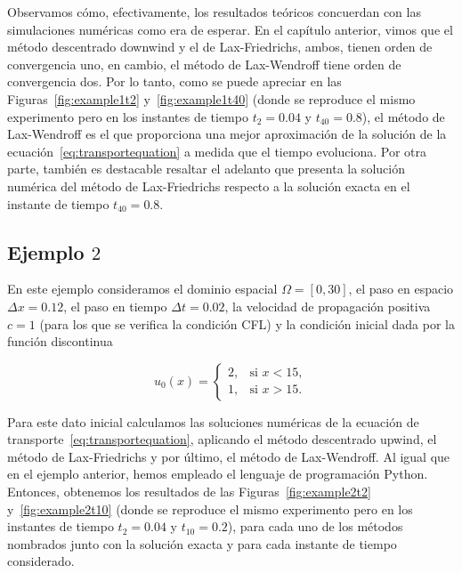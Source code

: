 Observamos cómo, efectivamente, los resultados teóricos concuerdan
con las simulaciones numéricas como era de esperar.
En el capítulo anterior, vimos que el método descentrado downwind y
el de Lax-Friedrichs, ambos, tienen orden de convergencia uno, en
cambio, el método de Lax-Wendroff tiene orden de convergencia dos.
Por lo tanto, como se puede apreciar en las
Figuras~\ref{fig:example1t2} y~\ref{fig:example1t40} (donde se
reproduce el mismo experimento pero en los instantes de tiempo
$t_{2}=0.04$ y $t_{40}=0.8$), el método de Lax-Wendroff es el que
proporciona una mejor aproximación de la solución de la
ecuación~\eqref{eq:transportequation} a medida que el tiempo
evoluciona.
Por otra parte, también es destacable resaltar el adelanto que
presenta la solución numérica del método de Lax-Friedrichs respecto a
la solución exacta en el instante de tiempo $t_{40}=0.8$.

\subsection*{Ejemplo $2$}

En este ejemplo consideramos el dominio espacial
$\Omega=\left[0,30\right]$, el paso en espacio $\Delta x=0.12$, el
paso en tiempo $\Delta t=0.02$, la velocidad de propagación positiva
$c=1$ (para los que se verifica la condición CFL) y la condición
inicial dada por la función discontinua

\begin{equation*}
	u_{0}\left(x\right)=
	\begin{cases}
		2, & \text{si }x<15, \\
		1, & \text{si }x>15.
	\end{cases}
\end{equation*}

Para este dato inicial calculamos las soluciones numéricas de la
ecuación de transporte~\eqref{eq:transportequation}, aplicando el
método descentrado upwind, el método de Lax-Friedrichs y por último,
el método de Lax-Wendroff.
Al igual que en el ejemplo anterior, hemos empleado el lenguaje de
programación Python.
Entonces, obtenemos los resultados de las
Figuras~\ref{fig:example2t2} y~\ref{fig:example2t10} (donde se
reproduce el mismo experimento pero en los instantes de tiempo
$t_{2}=0.04$ y $t_{10}=0.2$), para cada uno de los métodos nombrados
junto con la solución exacta y para cada instante de tiempo
considerado.

